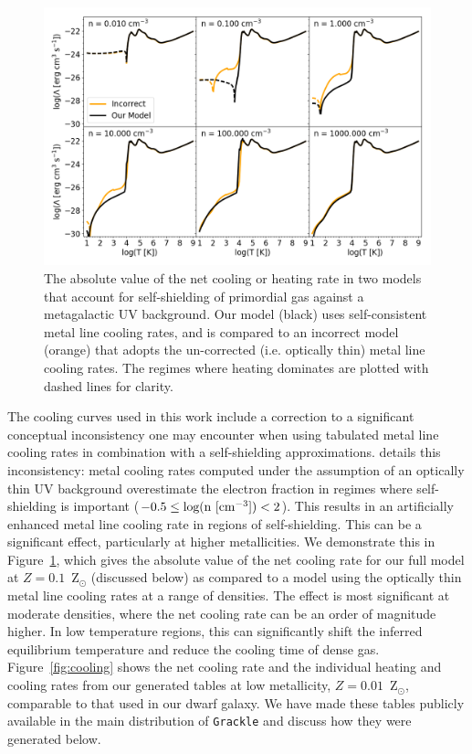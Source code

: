 \documentclass[twocolumn]{aastex61}
\begin{document}
\begin{figure}
\centering
\includegraphics[width=0.95\linewidth]{cooling_model_comparison}
\caption{The absolute value of the net cooling or heating rate in two models that account for self-shielding of primordial gas against a metagalactic UV background. Our model (black) uses self-consistent metal line cooling rates, and is compared to an incorrect model (orange) that adopts the un-corrected (i.e. optically thin) metal line cooling rates. The regimes where heating dominates are plotted with dashed lines for clarity.}
\label{fig:cooling comparison}
\end{figure}


The cooling curves used in this work include a correction to a significant conceptual inconsistency one may encounter when using tabulated metal line cooling rates in combination with a self-shielding approximations. \citet{Hu2017} details this inconsistency: metal cooling rates computed under the assumption of an optically thin UV background overestimate the electron fraction in regimes where self-shielding is important ($-0.5 \leq \rm{log(n~[cm^{-3}])} < 2$). This results in an artificially enhanced metal line cooling rate in regions of self-shielding. This can be a significant effect, particularly at higher metallicities. We demonstrate this in Figure~\ref{fig:cooling comparison}, which gives the absolute value of the net cooling rate for our full model at $Z = 0.1$~Z$_{\odot}$ (discussed below) as compared to a model using the optically thin metal line cooling rates at a range of densities. The effect is most significant at moderate densities, where the net cooling rate can be an order of magnitude higher. In low temperature regions, this can significantly shift the inferred equilibrium temperature and reduce the cooling time of dense gas. Figure~\ref{fig:cooling} shows the net cooling rate and the individual heating and cooling rates from our generated tables at low metallicity, $Z = 0.01$~Z$_{\odot}$, comparable to that used in our dwarf galaxy. We have made these tables publicly available in the main distribution of \texttt{Grackle} and discuss how they were generated below.
\end{document}
